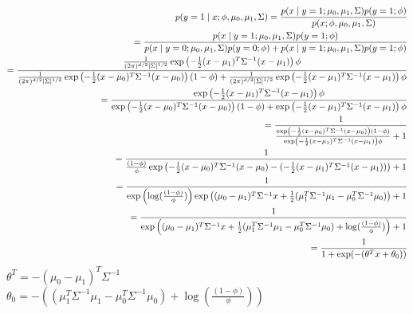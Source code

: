 \begin{answer}
\begin{align*}
p(y = 1\mid x; \phi, \mu_0, \mu_1, \Sigma)=\frac{p(x \mid y = 1;\mu_0, \mu_1, \Sigma)p(y=1;\phi)}{p(x;\phi, \mu_0, \mu_1, \Sigma)}\\
=\frac{p(x \mid y = 1;\mu_0, \mu_1, \Sigma)p(y=1;\phi)}{p(x \mid y = 0;\mu_0, \mu_1, \Sigma)p(y=0;\phi)+p(x \mid y = 1;\mu_0, \mu_1, \Sigma)p(y=1;\phi)}\\
=\frac{\frac{1}{(2\pi)^{{d}/2} |\Sigma|^{1/2}}\exp\left(-\frac{1}{2}(x-\mu_1)^T \Sigma^{-1} (x-\mu_1) \right)\phi}{\frac{1}{(2\pi)^{{d}/2} |\Sigma|^{1/2}}\exp\left(-\frac{1}{2}(x-\mu_{0})^T \Sigma^{-1} (x-\mu_{0})\right)(1-\phi)+\frac{1}{(2\pi)^{{d}/2} |\Sigma|^{1/2}}\exp\left(-\frac{1}{2}(x-\mu_1)^T \Sigma^{-1} (x-\mu_1) \right)\phi}\\
=\frac{\exp\left(-\frac{1}{2}(x-\mu_1)^T \Sigma^{-1} (x-\mu_1) \right)\phi}{\exp\left(-\frac{1}{2}(x-\mu_{0})^T \Sigma^{-1} (x-\mu_{0})\right)(1-\phi)+\exp\left(-\frac{1}{2}(x-\mu_1)^T \Sigma^{-1} (x-\mu_1) \right)\phi}\\
=\frac{1}{\frac{\exp\left(-\frac{1}{2}(x-\mu_{0})^T \Sigma^{-1} (x-\mu_{0})\right)(1-\phi)}{\exp\left(-\frac{1}{2}(x-\mu_1)^T \Sigma^{-1} (x-\mu_1) \right)\phi}+1}\\
=\frac{1}{\frac{(1-\phi)}{\phi}\exp\left(-\frac{1}{2}(x-\mu_{0})^T \Sigma^{-1} (x-\mu_{0})-(-\frac{1}{2}(x-\mu_1)^T \Sigma^{-1} (x-\mu_1))\right)+1}\\
=\frac{1}{\exp\left(\log(\frac{(1-\phi)}{\phi})\right)\exp\left((\mu_0-\mu_1)^T\Sigma^{-1}x+\frac{1}{2}(\mu_1^T\Sigma^{-1}\mu_1-\mu_0^T\Sigma^{-1}\mu_0)\right)+1}\\
=\frac{1}{\exp\left((\mu_0-\mu_1)^T\Sigma^{-1}x+\frac{1}{2}(\mu_1^T\Sigma^{-1}\mu_1-\mu_0^T\Sigma^{-1}\mu_0)+\log(\frac{(1-\phi)}{\phi})\right)+1}\\
= \frac{1}{1 + \exp(-(\theta^T x + \theta_0))}
\end{align*}
${\theta^T=-(\mu_0-\mu_1)^T\Sigma^{-1}}$\\
${\theta_0=-\left((\mu_1^T\Sigma^{-1}\mu_1-\mu_0^T\Sigma^{-1}\mu_0)+\log(\frac{(1-\phi)}{\phi})\right)}$
\end{answer}

